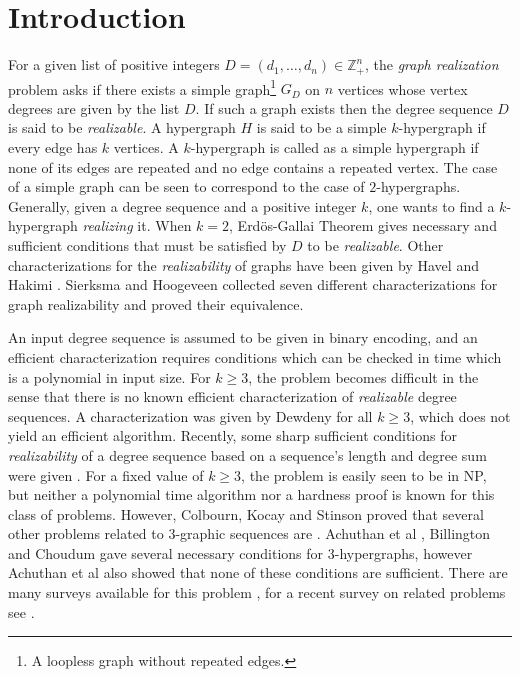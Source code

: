 \section{Introduction}

For a given list of positive integers $D=(d_1,\dots,d_n)\in \mathbb{Z}_+^n$, the {\em graph realization} problem asks if there exists a simple graph\footnote{A loopless graph without repeated edges.} $G_D$ on $n$ vertices whose vertex degrees are given by the list $D$.
If such a graph exists then the degree sequence $D$ is said to be {\em realizable}. 
A hypergraph $H$ is said to be a simple $k$-hypergraph if every edge has $k$ vertices. A $k$-hypergraph is called as a simple hypergraph if none of its edges are repeated and no edge contains a repeated vertex.
The case of a simple graph can be seen to correspond to the case of  $2$-hypergraphs. Generally, given a degree sequence and a positive integer $k$, one wants to find a $k$-hypergraph  {\em realizing} it.
When $k=2$, Erd\"os-Gallai Theorem \cite{gallai1960graphs} gives necessary and sufficient conditions that must be satisfied by $D$ to be {\em realizable}. 
Other characterizations for the {\em realizability} of graphs have been given by Havel \cite{havel1955remark} and Hakimi \cite{hakami1962realizability}. Sierksma and Hoogeveen  \cite{sierksma1991seven} collected seven different characterizations for graph realizability and proved their equivalence.

An input degree sequence is assumed to be given in binary encoding, and an efficient characterization requires conditions which can be checked in time which is a polynomial in input size.
For $k\geq3$, the problem becomes difficult in the sense that there is no known efficient characterization of {\em realizable} degree sequences. A characterization was given by Dewdeny \cite{dewdney1975degree} for all $k\geq 3$, which does not yield an efficient algorithm. Recently, some sharp sufficient conditions for {\em realizability} of a degree sequence based on a sequence's length and degree sum were given \cite{behrens2013new}. For a fixed value of $k\geq 3$, the problem is easily seen to be in {\sf NP}, but neither a polynomial time algorithm nor a hardness proof is known for this class of problems.
However, Colbourn, Kocay and Stinson \cite{colbourn1986some} proved that several other problems related to $3$-graphic sequences are \NPC.
Achuthan et al \cite{achuthan19933}, Billington \cite{billington1988conditions} and Choudum \cite{choudum1991graphic} gave several necessary conditions for $3$-hypergraphs, however Achuthan et al \cite{achuthan19933} also showed that none of these conditions are sufficient.
There are many surveys available for this problem \cite{hakimi1978graphs,rao1981survey,tyshkevich1987graphs1,tyshkevich1988graphs2,tyshkevich1988graphs3},
for a recent survey on related problems see \cite{ferrara2013some}.

